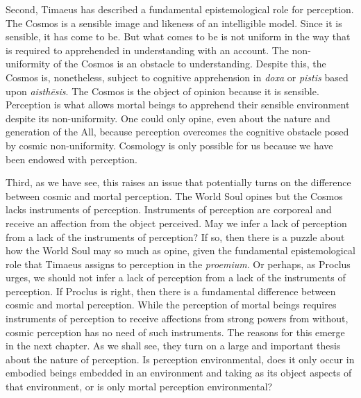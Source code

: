 Second, Timaeus has described a fundamental epistemological role for perception. The Cosmos is a sensible image and likeness of an intelligible model. Since it is sensible, it has come to be. But what comes to be is not uniform in the way that is required to apprehended in understanding with an account. The non-uniformity of the Cosmos is an obstacle to understanding. Despite this, the Cosmos is, nonetheless, subject to cognitive apprehension in \emph{doxa} or \emph{pistis} based upon \emph{aisthēsis}. The Cosmos is the object of opinion because it is sensible. Perception is what allows mortal beings to apprehend their sensible environment despite its non-uniformity. One could only opine, even about the nature and generation of the All, because perception overcomes the cognitive obstacle posed by cosmic non-uniformity. Cosmology is only possible for us because we have been endowed with perception.

Third, as we have see, this raises an issue that potentially turns on the difference between cosmic and mortal perception. The World Soul opines but the Cosmos lacks instruments of perception. Instruments of perception are corporeal and receive an affection from the object perceived. May we infer a lack of perception from a lack of the instruments of perception? If so, then there is a puzzle about how the World Soul may so much as opine, given the fundamental epistemological role that Timaeus assigns to perception in the \emph{proemium}. Or perhaps, as Proclus urges, we should not infer a lack of perception from a lack of the instruments of perception. If Proclus is right, then there is a fundamental difference between cosmic and mortal perception. While the perception of mortal beings requires instruments of perception to receive affections from strong powers from without, cosmic perception has no need of such instruments. The reasons for this emerge in the next chapter. As we shall see, they turn on a large and important thesis about the nature of perception. Is perception environmental, does it only occur in embodied beings embedded in an environment and taking as its object aspects of that environment, or is only mortal perception environmental?

